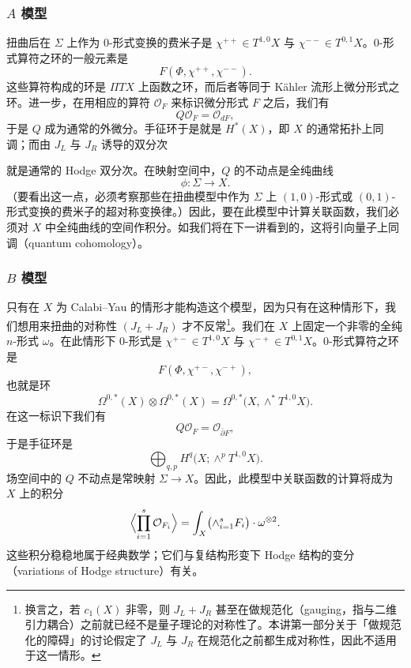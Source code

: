 \subsubsection{$A$ 模型}

扭曲后在 $\Sigma$ 上作为 0-形式变换的费米子是 $\chi^{++}\in T^{1,0}X$ 与 $\chi^{--}\in T^{0,1}X$。0-形式算符之环的一般元素是
\[
  F(\Phi,\chi^{++},\chi^{--}).
\]
这些算符构成的环是 $\Pi TX$ 上函数之环，而后者等同于 Kähler 流形上微分形式之环。进一步，在用相应的算符 $\mathcal O_F$ 来标识微分形式 $F$ 之后，我们有
\[
  Q\mathcal O_F=\mathcal O_{dF},
\]
于是 $Q$ 成为通常的外微分。手征环于是就是 $H^*(X)$，即 $X$ 的通常拓扑上同调；而由 $J_L$ 与 $J_R$ 诱导的双分次 %


就是通常的 Hodge 双分次。在映射空间中，$Q$ 的不动点是全纯曲线
\[
  \phi:\Sigma\longrightarrow X.
\]
（要看出这一点，必须考察那些在扭曲模型中作为 $\Sigma$ 上 $(1,0)$-形式或 $(0,1)$-形式变换的费米子的超对称变换律。）因此，要在此模型中计算关联函数，我们必须对 $X$ 中全纯曲线的空间作积分。如我们将在下一讲看到的，这将引向量子上同调（quantum cohomology）。

\subsubsection{$B$ 模型}

只有在 $X$ 为 Calabi--Yau 的情形才能构造这个模型，因为只有在这种情形下，我们想用来扭曲的对称性 $(J_L+J_R)$ 才不反常\footnote{换言之，若 $c_1(X)$ 非零，则 $J_L+J_R$ 甚至在做规范化（gauging，指与二维引力耦合）之前就已经不是量子理论的对称性了。本讲第一部分关于「做规范化的障碍」的讨论假定了 $J_L$ 与 $J_R$ 在规范化之前都生成对称性，因此不适用于这一情形。}。我们在 $X$ 上固定一个非零的全纯 $n$-形式 $\omega$。在此情形下 0-形式是 $\chi^{+-}\in T^{1,0}X$ 与 $\chi^{-+}\in T^{0,1}X$。0-形式算符之环是
\[
  F(\Phi,\chi^{+-},\chi^{-+}),
\]
也就是环
\[
  \Omega^{0,*}(X)\otimes\Omega^{0,*}(X)=\Omega^{0,*}\bigl(X,\wedge^*T^{1,0}X\bigr).
\]
在这一标识下我们有
\[
  Q\mathcal O_F=\mathcal O_{\bar\partial F},
\]
于是手征环是
\[
  \bigoplus_{q,p}H^q\bigl(X;\wedge^pT^{1,0}X\bigr).
\]
场空间中的 $Q$ 不动点是常映射 $\Sigma\to X$。因此，此模型中关联函数的计算将成为 $X$ 上的积分
\[
  \Bigl\langle\prod_{i=1}^{s}\mathcal O_{F_i}\Bigr\rangle=\int_X\bigl(\wedge_{i=1}^{s}F_i\bigr)\cdot\omega^{\otimes2}.
\]
这些积分稳稳地属于经典数学；它们与复结构形变下 Hodge 结构的变分（variations of Hodge structure）有关。


